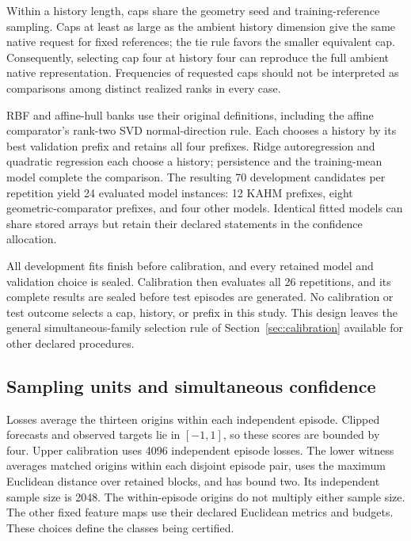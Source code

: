 Within a history length, caps share the geometry seed and training-reference
sampling. Caps at least as large as the ambient history dimension give the
same native request for fixed references; the tie rule favors the smaller
equivalent cap. Consequently, selecting cap four at history four can reproduce
the full ambient native representation. Frequencies of requested caps should
not be interpreted as comparisons among distinct realized ranks in every case.

RBF and affine-hull banks use their original definitions, including the
affine comparator's rank-two SVD normal-direction rule. Each chooses a
history by its best validation prefix and retains all four prefixes.
Ridge autoregression and quadratic regression each choose a history;
persistence and the training-mean model complete the comparison. The resulting
70 development candidates per repetition yield 24 evaluated model instances:
12 KAHM prefixes, eight geometric-comparator prefixes, and four other models.
Identical fitted models can share stored arrays but retain their declared
statements in the confidence allocation.

All \DimDevelopmentFits{} development fits finish before calibration, and
every retained model and validation choice is sealed. Calibration then
evaluates all 26 repetitions, and its complete results are sealed before test
episodes are generated. No calibration or test outcome selects a cap,
history, or prefix in this study. This design leaves the general
simultaneous-family selection rule of Section~\ref{sec:calibration}
available for other declared procedures.

\subsection{Sampling units and simultaneous confidence}

Losses average the thirteen origins within each independent episode.
Clipped forecasts and observed targets lie in $[-1,1]$, so these scores are
bounded by four. Upper calibration uses 4096 independent episode losses.
The lower witness averages matched origins within each disjoint episode pair,
uses the maximum Euclidean distance over retained blocks, and has bound two.
Its independent sample size is 2048. The within-episode origins do not multiply
either sample size. The other fixed feature maps use their declared
Euclidean metrics and budgets. These choices define the classes being
certified.

